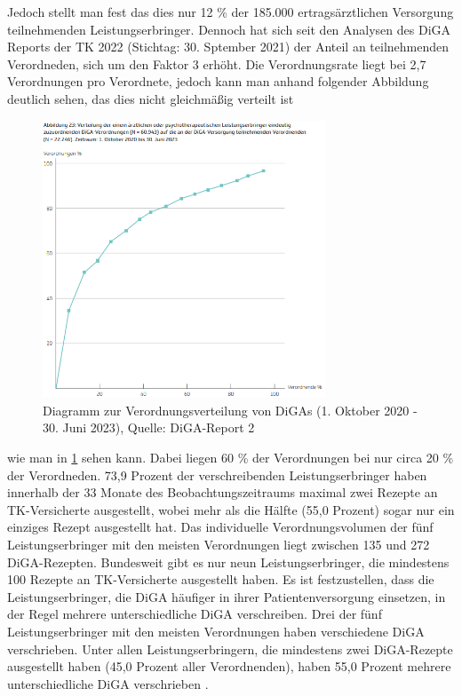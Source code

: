\documentclass{article}
\begin{document}
			Jedoch stellt man fest das dies nur 12 \% der 185.000 ertragsärztlichen Versorgung teilnehmenden Leistungserbringer. Dennoch hat sich seit den Analysen des DiGA Reports der TK 2022 (Stichtag: 30. Sptember 2021) der Anteil an teilnehmenden Verordneden, sich um den Faktor 3 erhöht. Die Verordnungsrate liegt bei 2,7 Verordnungen pro Verordnete, jedoch kann man anhand folgender Abbildung deutlich sehen, das dies nicht gleichmäßig verteilt ist
			\begin{figure}[hbtp]
				\centering
				\includegraphics[width=0.75\textwidth]{./grafiken/abbildung_verordnungen_pro_verordneten_diga}
				\caption[Verordnungsverteilung (1. Oktober 2020 - 30. Juni 2023)]{Diagramm zur Verordnungsverteilung von DiGAs (1. Oktober 2020 - 30. Juni 2023), Quelle: DiGA-Report 2 \cite{TK-Report-2}}
				\label{Abb-verordnungen-diga}
			\end{figure}
			wie man in \ref{Abb-verordnungen-diga} sehen kann. Dabei liegen 60 \% der Verordnungen bei nur circa 20 \% der Verordneden. 73,9 Prozent der verschreibenden Leistungserbringer haben innerhalb der 33 Monate des Beobachtungszeitraums maximal zwei Rezepte an TK-Versicherte ausgestellt, wobei mehr als die Hälfte (55,0 Prozent) sogar nur ein einziges Rezept ausgestellt hat. Das individuelle Verordnungsvolumen der fünf Leistungserbringer mit den meisten Verordnungen liegt zwischen 135 und 272 DiGA-Rezepten. Bundesweit gibt es nur neun Leistungserbringer, die mindestens 100 Rezepte an TK-Versicherte ausgestellt haben. Es ist festzustellen, dass die Leistungserbringer, die DiGA häufiger in ihrer Patientenversorgung einsetzen, in der Regel mehrere unterschiedliche DiGA verschreiben. Drei der fünf Leistungserbringer mit den meisten Verordnungen haben verschiedene DiGA verschrieben. Unter allen Leistungserbringern, die mindestens zwei DiGA-Rezepte ausgestellt haben (45,0 Prozent aller Verordnenden), haben 55,0 Prozent mehrere unterschiedliche DiGA verschrieben \cite[vgl. S. 28]{TK-Report-2}.
			
\end{document}
